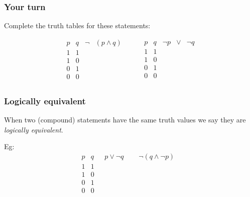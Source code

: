 \documentclass[10pt]{beamer}
\theoremstyle{definition}
\begin{document}
\begin{frame}
\frametitle{Your turn}

Complete the truth tables for these statements:


\[\begin{array}{c|c|ccc}
 p & q & \neg &(p  \wedge  q)\\
 \hline
  1 & 1 &  & \\
 1 & 0 &  & \\
 0& 1  &  & \\
 0 & 0 &  & \\
\end{array} \hspace{1cm} 
\begin{array}{c|c|cccc}
 p & q & \neg p &   \vee  & \neg q\\
 \hline
  1 & 1 &  & \\
 1 & 0 &  & \\
 0& 1  &  & \\
 0 & 0 &  & \\
\end{array}\]



\vspace{2cm}
\vfill
\end{frame}


\begin{frame}
\frametitle{Logically equivalent}

When two (compound) statements have the same truth values we say they are {\em logically equivalent}. 
\pause \bigskip

Eg: 
$$\begin{array}{c|c|c|cc}
 p & q & \ \ \  p\vee \neg q  \ \ \  &\ \ \  \neg ( q \wedge \neg p)  \ \  \  \\
 \hline
 1 & 1 &  \\
 1 & 0 &  \\
 0& 1  &  \\
 0 & 0 &  \\
\end{array}$$

\vspace{2cm}
\vfill
\end{frame}
\end{document}
